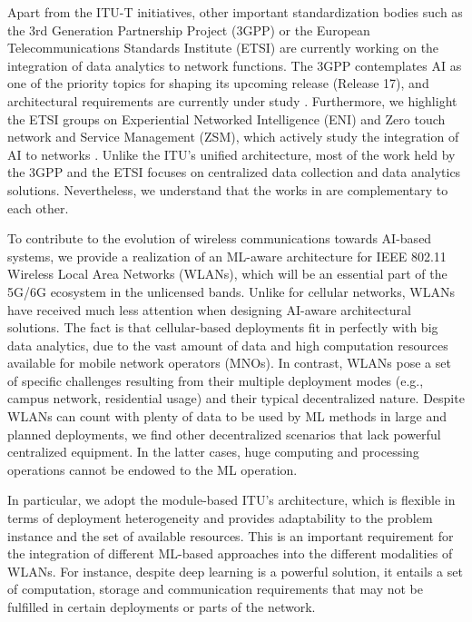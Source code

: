 \documentclass[twocolumn]{article}
\begin{document}
Apart from the ITU-T initiatives, other important standardization bodies such as the 3rd Generation Partnership Project (3GPP) or the European Telecommunications Standards Institute (ETSI) are currently working on the integration of data analytics to network functions. The 3GPP contemplates AI as one of the priority topics for shaping its upcoming release (Release 17), and architectural requirements are currently under study \cite{3gpp2019study}. Furthermore, we highlight the ETSI groups on Experiential Networked Intelligence (ENI) and Zero touch network and Service Management (ZSM), which actively study the integration of AI to networks \cite{etsi2019architecture}. Unlike the ITU's unified architecture, most of the work held by the 3GPP and the ETSI focuses on centralized data collection and data analytics solutions. Nevertheless, we understand that the works in \cite{itu2019architecture, 3gpp2019study, etsi2019architecture} are complementary to each other.

To contribute to the evolution of wireless communications towards AI-based systems, we provide a realization of an ML-aware architecture for IEEE 802.11 Wireless Local Area Networks (WLANs), which will be an essential part of the 5G/6G ecosystem in the unlicensed bands. Unlike for cellular networks, WLANs have received much less attention when designing AI-aware architectural solutions. The fact is that cellular-based deployments fit in perfectly with big data analytics, due to the vast amount of data and high computation resources available for mobile network operators (MNOs). In contrast, WLANs pose a set of specific challenges resulting from their multiple deployment modes (e.g., campus network, residential usage) and their typical decentralized nature. Despite WLANs can count with plenty of data to be used by ML methods in large and planned deployments, we find other decentralized scenarios that lack powerful centralized equipment. In the latter cases, huge computing and processing operations cannot be endowed to the ML operation.

In particular, we adopt the module-based ITU's architecture, which is flexible in terms of deployment heterogeneity and provides adaptability to the problem instance and the set of available resources. This is an important requirement for the integration of different ML-based approaches into the different modalities of WLANs. For instance, despite deep learning is a powerful solution, it entails a set of computation, storage and communication requirements that may not be fulfilled in certain deployments or parts of the network.
\end{document}
